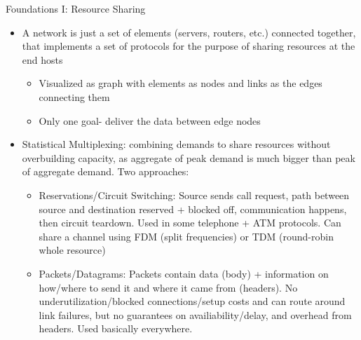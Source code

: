 \documentclass{beamer}
\begin{document}
\begin{frame}[t]{Foundations I: Resource Sharing}
 \begin{itemize}
     \item A \alert{network} is just a set of \alert{elements} (servers, routers, etc.) connected together, that implements a set of \alert{protocols} for the purpose of \alert{sharing resources} at the end hosts
     \begin{itemize}
        \item Visualized as graph with elements as nodes and \alert{links} as the edges connecting them
        \item \pause Only one goal- deliver the data between edge nodes
     \end{itemize}
     \item \pause \alert{Statistical Multiplexing}: combining demands to share resources without overbuilding capacity, as aggregate of peak demand is much bigger than peak of aggregate demand. Two approaches:
    \begin{itemize}
        \item \pause \alert{Reservations/Circuit Switching}: Source sends call request, path between source and destination reserved + blocked off, communication happens, then circuit teardown. Used in some telephone + ATM protocols. Can share a channel using FDM (split frequencies) or TDM (round-robin whole resource)
        \item \pause \alert{Packets/Datagrams}: Packets contain data (body) + information on how/where to send it and where it came from (headers). No underutilization/blocked connections/setup costs and can route around link failures, but no guarantees on availiability/delay, and overhead from headers. Used basically everywhere. 
    \end{itemize}
 \end{itemize}    
\end{frame}
\end{document}
